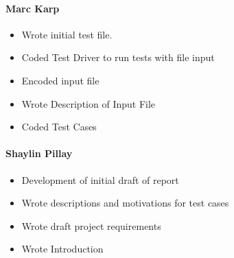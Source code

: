 \documentclass[]{article}
\begin{document}
\paragraph{Marc Karp}
\begin{itemize}
	\item Wrote initial test file.
\item	Coded Test Driver to run tests with file input
\item 	Encoded input file
\item	Wrote Description of Input File
\item	Coded Test Cases
\end{itemize}
\paragraph{Shaylin Pillay}
\begin{itemize}
	

\item Development of initial draft of report
\item Wrote descriptions and motivations for test cases
\item Wrote draft project requirements
\item Wrote Introduction

\end{itemize}
\end{document}
